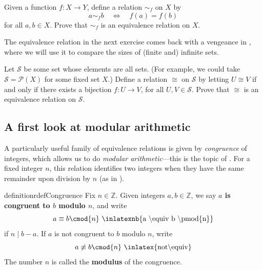 \begin{exercise}
\label{exEquivalenceRelationFromFunction}
Given a function $f : X \to Y$, define a relation $\sim_f$ on $X$ by
\[ a \sim_f b \quad \Leftrightarrow \quad f(a) = f(b) \]
for all $a,b \in X$. Prove that $\sim_f$ is an equivalence relation on $X$.
\end{exercise}

The equivalence relation in the next exercise comes back with a vengeance in , where we will use it to compare the sizes of (finite and) infinite sets.

\begin{exercise}
\label{exBijectionIsEquivalenceRelation}
Let $\mathcal{S}$ be some set whose elements are all sets. (For example, we could take $\mathcal{S} = \mathcal{P}(X)$ for some fixed set $X$.) Define a relation $\cong$  on $\mathcal{S}$ by letting $U \cong V$ if and only if there exists a bijection $f : U \to V$, for all $U,V \in \mathcal{S}$. Prove that $\cong$ is an equivalence relation on $\mathcal{S}$.
\end{exercise}

\subsection*{A first look at modular arithmetic}

A particularly useful family of equivalence relations is given by \textit{congruence} of integers, which allows us to do \textit{modular arithmetic}---this is the topic of . For a fixed integer $n$, this relation identifies two integers when they have the same remainder upon division by $n$ (as in ).

\begin{restatable}{definition}{rdefCongruence}
\label{defCongruence}
Fix $n \in \mathbb{Z}$. Given integers $a,b \in \mathbb{Z}$, we say \textbf{$a$ is congruent to $b$ modulo $n$}, and write
\[ a \equiv b \cmod{n} \text{ \inlatexnb{a \textbackslash{}equiv b \textbackslash{}pmod\{n\}}} \]
if $n \mid b-a$. If $a$ is not congruent to $b$ modulo $n$, write
\[ a \not \equiv b \cmod{n} \text{ \inlatex{not\textbackslash{}equiv}} \]
The number $n$ is called the \textbf{modulus} of the congruence.
\end{restatable}

